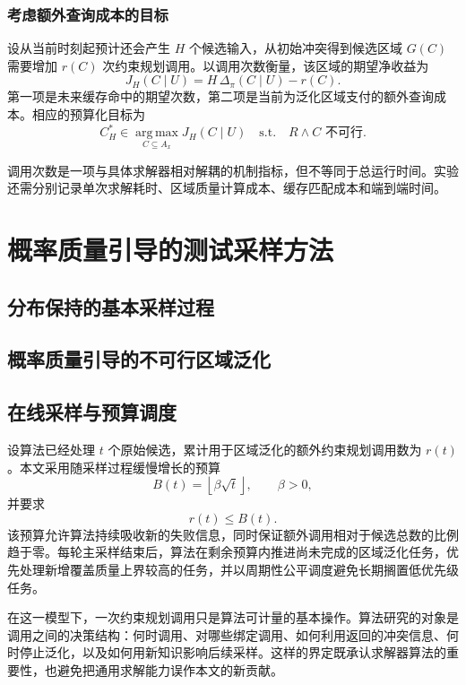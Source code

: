 \documentclass[UTF8, fontset=none, a4paper, 12pt]{ctexart}
\begin{document}
\subsubsection{考虑额外查询成本的目标}

设从当前时刻起预计还会产生 $H$ 个候选输入，从初始冲突得到候选区域 $G(C)$ 需要增加 $r(C)$ 次约束规划调用。以调用次数衡量，该区域的期望净收益为
\[
  J_H(C\mid U)
  =H\,\Delta_{\pi}(C\mid U)-r(C).
\]
第一项是未来缓存命中的期望次数，第二项是当前为泛化区域支付的额外查询成本。相应的预算化目标为
\[
  C_H^*\in
  \operatorname*{arg\,max}_{C\subseteq A_x}
  J_H(C\mid U)
  \quad\text{s.t.}\quad
  R\land C\text{ 不可行}.
\]

调用次数是一项与具体求解器相对解耦的机制指标，但不等同于总运行时间。实验还需分别记录单次求解耗时、区域质量计算成本、缓存匹配成本和端到端时间。

\section{概率质量引导的测试采样方法}

\subsection{分布保持的基本采样过程}


\subsection{概率质量引导的不可行区域泛化}


\subsection{在线采样与预算调度}

设算法已经处理 $t$ 个原始候选，累计用于区域泛化的额外约束规划调用数为 $r(t)$。本文采用随采样过程缓慢增长的预算
\[
  B(t)=\left\lfloor\beta\sqrt{t}\right\rfloor,
  \qquad \beta>0,
\]
并要求
\[
  r(t)\le B(t).
\]
该预算允许算法持续吸收新的失败信息，同时保证额外调用相对于候选总数的比例趋于零。每轮主采样结束后，算法在剩余预算内推进尚未完成的区域泛化任务，优先处理新增覆盖质量上界较高的任务，并以周期性公平调度避免长期搁置低优先级任务。

在这一模型下，一次约束规划调用只是算法可计量的基本操作。算法研究的对象是调用之间的决策结构：何时调用、对哪些绑定调用、如何利用返回的冲突信息、何时停止泛化，以及如何用新知识影响后续采样。这样的界定既承认求解器算法的重要性，也避免把通用求解能力误作本文的新贡献。
\end{document}
